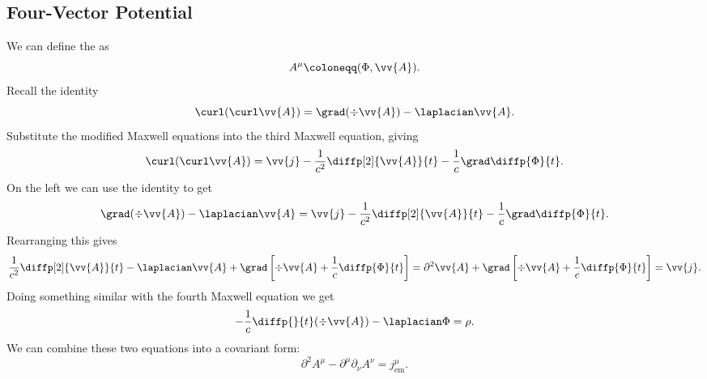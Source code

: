\documentclass[fleqn]{NotesClass}
\newcommand{\dalembertian}{\partial^2}
\newcommand{\EM}{\text{em}}
\begin{document}
\begin{appendices}
        \subsection{Four-Vector Potential}
        We can define the  as
        \begin{equation}
            A^\mu \coloneqq (\Phi, \vv{A}).
        \end{equation}
        Recall the identity
        \begin{equation}
            \curl (\curl \vv{A}) = \grad(\div\vv{A}) - \laplacian\vv{A}.
        \end{equation}
        Substitute the modified Maxwell equations into the third Maxwell equation, giving
        \begin{equation}
            \curl(\curl \vv{A}) = \vv{j} - \frac{1}{c^2}\diffp[2]{\vv{A}}{t} - \frac{1}{c} \grad \diffp{\Phi}{t}.
        \end{equation}
        On the left we can use the identity to get
        \begin{equation}
            \grad(\div\vv{A}) - \laplacian\vv{A} = \vv{j} - \frac{1}{c^2}\diffp[2]{\vv{A}}{t} - \frac{1}{c} \grad \diffp{\Phi}{t}.
        \end{equation}
        Rearranging this gives
        \begin{equation}
            \frac{1}{c^2}\diffp[2]{\vv{A}}{t} - \laplacian\vv{A} + \grad\left[ \div\vv{A} + \frac{1}{c}\diffp{\Phi}{t} \right] = \dalembertian\vv{A} + \grad\left[ \div\vv{A} + \frac{1}{c}\diffp{\Phi}{t} \right] = \vv{j}.
        \end{equation}
        Doing something similar with the fourth Maxwell equation we get
        \begin{equation}
            -\frac{1}{c}\diffp{}{t}(\div\vv{A}) - \laplacian\Phi = \rho.
        \end{equation}
        We can combine these two equations into a covariant form:
        \begin{equation}\label{eqn:dalembertian Amu - partial mu partial nu Anu = jmu}
            \dalembertian A^\mu - \partial^\mu \partial_\nu A^\nu = j_{\EM}^\mu.
        \end{equation}
        

\end{appendices}
\end{document}
